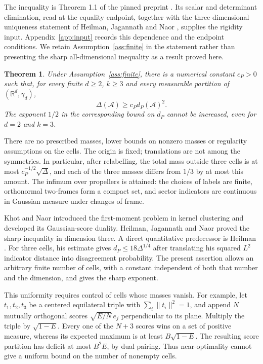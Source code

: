 \documentclass[11pt,reqno]{amsart}
\numberwithin{equation}{section}
\newtheorem{theorem}{Theorem}[section]
\theoremstyle{definition}
\theoremstyle{remark}
\newcommand{\R}{\mathbb R}
\begin{document}
The inequality is Theorem 1.1 of the pinned preprint \cite{OpenAI}.
Its scalar and determinant elimination, read at the equality endpoint,
together with the three-dimensional uniqueness statement of Heilman,
Jagannath and Naor \cite[author version, Remark 1.4]{HJN}, supplies
the rigidity input. Appendix~\ref{app:input} records this dependence
and the endpoint conditions. We retain Assumption~\ref{ass:finite}
in the statement rather than presenting the sharp all-dimensional
inequality as a result proved here.

\begin{theorem}\label{thm:main}
Under Assumption~\ref{ass:finite}, there is a numerical constant
$c_P>0$ such that, for every finite $d\ge2$, $k\ge3$ and every
measurable partition of $(\R^d,\gamma_d)$,
\begin{equation}\label{eq:main}
                         \Delta(\mathcal A)\ge c_P d_P(\mathcal A)^2.
\end{equation}
The exponent $1/2$ in the corresponding bound on $d_P$ cannot be
increased, even for $d=2$ and $k=3$.
\end{theorem}

There are no prescribed masses, lower bounds on nonzero masses or
regularity assumptions on the cells. The origin is fixed; translations
are not among the symmetries. In particular, after relabelling, the
total mass outside three cells is at most $c_P^{-1/2}\sqrt\Delta$,
and each of the three masses differs from $1/3$ by at most this amount.
The infimum over propellers is attained: the choices of labels are
finite, orthonormal two-frames form a compact set, and sector
indicators are continuous in Gaussian measure under changes of frame.

Khot and Naor \cite{KN} introduced the first-moment problem in kernel
clustering and developed its Gaussian-score duality. Heilman,
Jagannath and Naor \cite{HJN} proved the sharp inequality in dimension
three. A direct quantitative predecessor is Heilman
\cite[Lemma 2.8]{Heilman}. For three cells, his estimate gives
$d_P\le18\Delta^{1/4}$ after translating his squared $L^2$ indicator
distance into disagreement probability. The present assertion allows
an arbitrary finite number of cells, with a constant independent of
both that number and the dimension, and gives the sharp exponent.

This uniformity requires control of cells whose masses vanish.
For example, let $t_1,t_2,t_3$ be a centered equilateral triple with
$\sum_i\|t_i\|^2=1$, and append $N$ mutually orthogonal scores
$\sqrt{E/N}\,e_j$ perpendicular to its plane. Multiply the triple
by $\sqrt{1-E}$. Every one of the $N+3$ scores wins on a set of
positive measure, whereas its expected maximum is at least
$B\sqrt{1-E}$. The resulting score partition has deficit at most
$B^2E$, by dual pairing. Thus near-optimality cannot give a uniform
bound on the number of nonempty cells.
\end{document}
